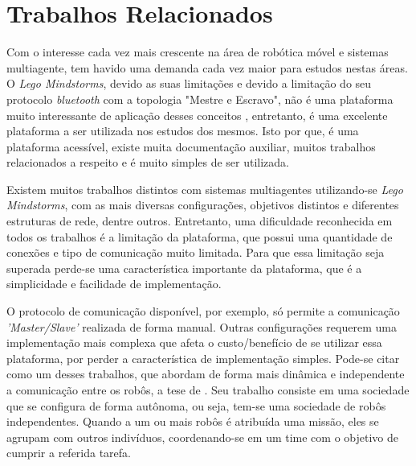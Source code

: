 %
%
\chapter{Trabalhos Relacionados}
\label{chap:trabalhosRelacionados}
Com o interesse cada vez mais crescente na área de robótica móvel e sistemas multiagente, tem havido uma demanda cada vez maior para estudos nestas áreas. O \emph{Lego Mindstorms\textregistered}, devido as suas limitações e devido a limitação do seu protocolo \emph{bluetooth} com a topologia "Mestre e Escravo", não é uma plataforma muito interessante de aplicação desses conceitos , entretanto, é uma excelente plataforma a ser utilizada nos estudos dos mesmos. Isto por que, é uma plataforma acessível, existe muita documentação auxiliar, muitos trabalhos relacionados a respeito e é muito simples de ser utilizada. %

Existem muitos trabalhos distintos com sistemas multiagentes utilizando-se \emph{Lego Mindstorms\textregistered}, com as mais diversas configurações, objetivos distintos e diferentes estruturas de rede, dentre outros. Entretanto, uma dificuldade reconhecida em todos os trabalhos é a limitação da plataforma, que possui uma quantidade de conexões e tipo de comunicação muito limitada. Para que essa limitação seja superada perde-se uma característica importante da plataforma, que é a simplicidade e facilidade de implementação. 

O protocolo de comunicação disponível, por exemplo, só permite a comunicação \emph{'Master/Slave'} realizada de forma manual. Outras configurações requerem uma implementação mais complexa que afeta o custo/benefício de se utilizar essa plataforma, por perder a característica de implementação simples. Pode-se citar como um desses trabalhos, que abordam de forma mais dinâmica e independente a comunicação entre os robôs, a tese de . Seu trabalho consiste em uma sociedade que se configura de forma autônoma, ou seja, tem-se uma sociedade de robôs independentes. Quando a um ou mais robôs é atribuída uma missão, eles se agrupam com outros indivíduos, coordenando-se em um time com o objetivo de cumprir a referida tarefa. %

